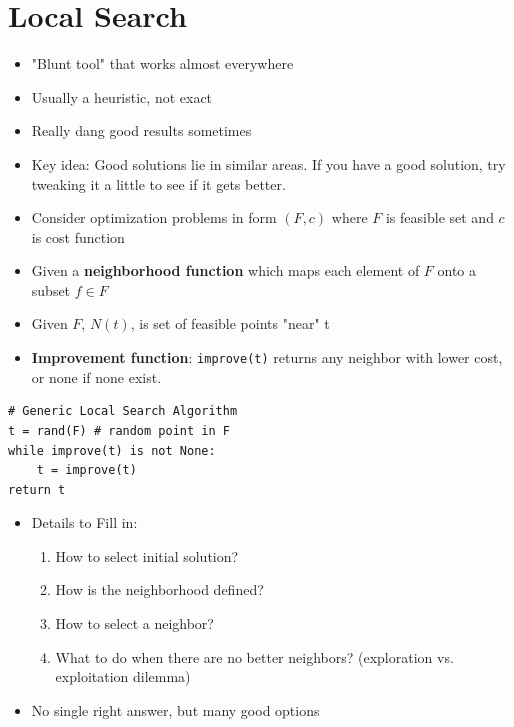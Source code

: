 \documentclass[12pt, letter]{article}
\begin{document}
\section{Local Search}%
\label{sec:local_search}
\begin{itemize}
	\item "Blunt tool" that works almost everywhere
	\item Usually a heuristic, not exact
	\item Really dang good results sometimes
	\item Key idea: Good solutions lie in similar areas. If you have a good solution, try tweaking it a little to see if it gets better.
	\item Consider optimization problems in form $(F,c)$ where  $F$ is feasible set and $c$ is cost function
	\item Given a \textbf{neighborhood function} which maps each element of $F$ onto a subset $f \in F$ 
	\item Given $F$, $N(t)$, is set of feasible points "near" t
	\item \textbf{Improvement function}: \texttt{improve(t)} returns any neighbor with lower cost, or none if none exist.
\end{itemize}

\begin{verbatim}
# Generic Local Search Algorithm
t = rand(F) # random point in F
while improve(t) is not None:
    t = improve(t)
return t
\end{verbatim}

\begin{itemize}
    \item Details to Fill in:
    \begin{enumerate}
        \item How to select initial solution?
        \item How is the neighborhood defined?
        \item How to select a neighbor?
        \item What to do when there are no better neighbors? (exploration vs. exploitation dilemma)
    \end{enumerate}
    \item No single right answer, but many good options
\end{itemize}
\end{document}
